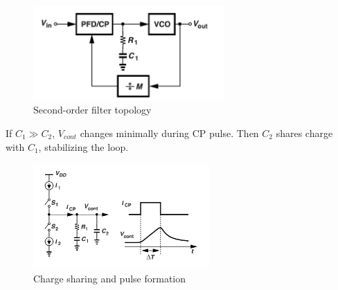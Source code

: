 \documentclass[12pt]{article}
\begin{document}
\begin{figure}[H]
    \centering
    \includegraphics[width=0.65\textwidth]{figs/cp9}
    \caption{Second-order filter topology}
\end{figure}

If $C_1 \gg C_2$, $V_{cont}$ changes minimally during CP pulse. Then $C_2$ shares charge with $C_1$, stabilizing the loop.

\begin{figure}[H]
    \centering
    \includegraphics[width=0.6\textwidth]{figs/cp10}
    \caption{Charge sharing and pulse formation}
\end{figure}
\end{document}
